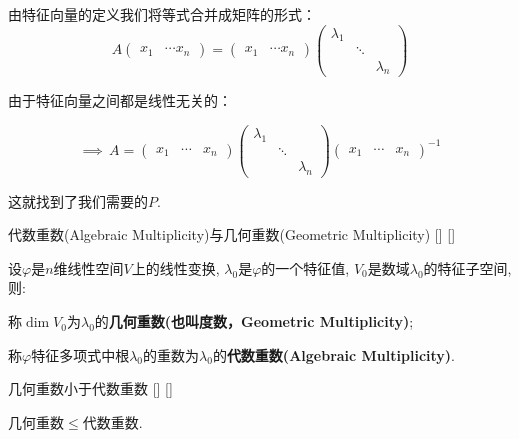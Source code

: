 \documentclass[UTF8]{ctexart}
\begin{document}
		\begin{prf}

			由特征向量的定义我们将等式合并成矩阵的形式：\begin{displaymath}
				A\begin{pmatrix}
					x_1& \cdots x_n
				\end{pmatrix}=\begin{pmatrix}
					x_1& \cdots x_n
				\end{pmatrix}\begin{pmatrix}
					\lambda_1&&\\ &\ddots&\\ &&\lambda_n
				\end{pmatrix}
			\end{displaymath}

			由于特征向量之间都是线性无关的：

			\begin{displaymath}
				\implies\,A=\begin{pmatrix}
					x_1& \cdots& x_n
				\end{pmatrix}\begin{pmatrix}
					\lambda_1&&\\ &\ddots&\\ &&\lambda_n
				\end{pmatrix}\begin{pmatrix}
					x_1& \cdots& x_n
				\end{pmatrix}^{-1}
			\end{displaymath}
			
			这就找到了我们需要的$P$.

		\end{prf}

		\begin{dfn}
			[]
			{代数重数(Algebraic Multiplicity)与几何重数(Geometric Multiplicity)}
			[]
			[]

			设$\varphi$是$n$维线性空间$V$上的线性变换, $\lambda_0$是$\varphi$的一个特征值, $V_0$是数域$\lambda_0$的特征子空间, 则: 
			
			称$\dim V_0$为$\lambda_0$的\textbf{几何重数(也叫度数，Geometric Multiplicity)}; 

			称$\varphi$特征多项式中根$\lambda_0$的重数为$\lambda_0$的\textbf{代数重数(Algebraic Multiplicity)}. 
		\end{dfn}
		
		\begin{ppt}
			[]
			{几何重数小于代数重数}
			[]
			[]

			几何重数$\leq$代数重数. 
		\end{ppt}
\end{document}
